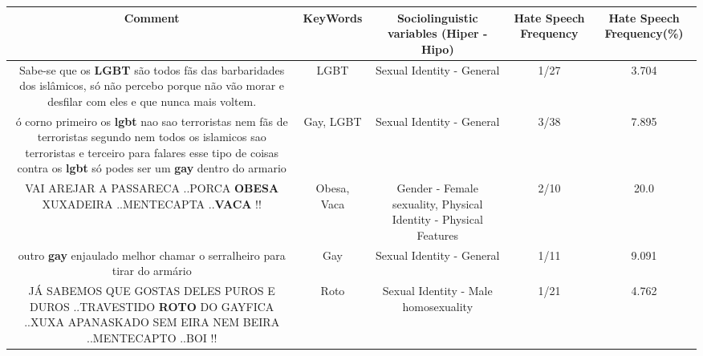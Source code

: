 \documentclass[11pt]{article}
\newlength\mylength
\begin{document}
\begin{center}
\setlength\mylength{\dimexpr\textwidth - 1\arrayrulewidth - 50\tabcolsep}
\begin{longtable}{|C{.65\mylength}|C{.30\mylength}|C{.12\mylength}|C{.12\mylength}|C{.12\mylength}|}
\hline
\textbf{Comment} & \textbf{KeyWords} & \textbf{Sociolinguistic variables (Hiper - Hipo)}  & \textbf{Hate Speech Frequency} & \textbf{Hate Speech Frequency(\%)} \\
\hline{}\small Sabe-se que os \textbf{LGBT} são todos fãs das barbaridades dos islâmicos, só não percebo porque não vão morar e desfilar com eles e que nunca mais voltem.\normalsize   & LGBT & Sexual Identity - General & 1/27 & 3.704 \\  \hline
  \small ó corno primeiro os \textbf{lgbt} nao sao terroristas nem fãs de terroristas segundo nem todos os islamicos sao terroristas e terceiro para falares esse tipo de coisas contra os \textbf{lgbt} só podes ser um \textbf{gay} dentro do armario\normalsize   & Gay, LGBT & Sexual Identity - General & 3/38 & 7.895 \\  \hline
  \small VAI AREJAR A PASSARECA ..PORCA \textbf{OBESA} XUXADEIRA ..MENTECAPTA ..\textbf{VACA} !!\normalsize   & Obesa, Vaca & Gender - Female sexuality, Physical Identity - Physical Features & 2/10 & 20.0 \\  \hline
  \small outro \textbf{gay} enjaulado melhor chamar o serralheiro para tirar do armário\normalsize   & Gay & Sexual Identity - General & 1/11 & 9.091 \\  \hline
  \small JÁ SABEMOS QUE GOSTAS DELES PUROS E DUROS ..TRAVESTIDO \textbf{ROTO} DO GAYFICA ..XUXA APANASKADO SEM EIRA NEM BEIRA ..MENTECAPTO ..BOI !!\normalsize   & Roto & Sexual Identity - Male homosexuality & 1/21 & 4.762 \\  \hline
  
\end{longtable}
\end{center}
\end{document}
